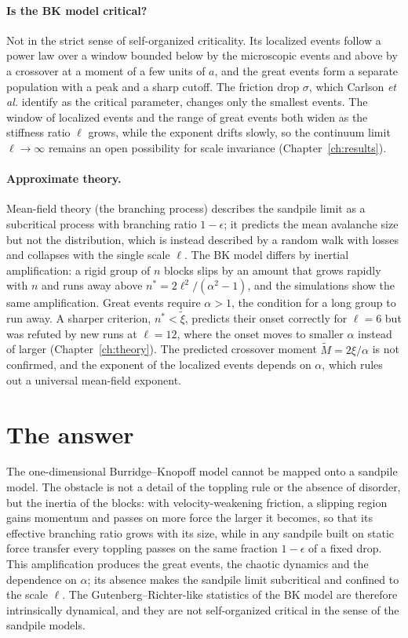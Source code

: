 \paragraph{Is the BK model critical?} Not in the strict sense of self-organized criticality. Its localized events follow a power law over a window bounded below by the
microscopic events and above by a crossover at a moment of a few units of $a$, and the great events form a separate population with a peak and a sharp cutoff. The friction
drop $\sigma$, which Carlson \emph{et al.} identify as the critical parameter, changes only the smallest events. The window of localized events and the range of great events
both widen as the stiffness ratio $\ell$ grows, while the exponent drifts slowly, so the continuum limit $\ell\to\infty$ remains an open possibility for scale invariance
(Chapter~\ref{ch:results}).

\paragraph{Approximate theory.} Mean-field theory (the branching process) describes the sandpile limit as a subcritical process with branching ratio $1-\epsilon$; it
predicts the mean avalanche size but not the distribution, which is instead described by a random walk with losses and collapses with the single scale $\ell$. The BK model
differs by inertial amplification: a rigid group of $n$ blocks slips by an amount that grows rapidly with $n$ and runs away above $n^* = 2\ell^2/(\alpha^2-1)$, and the
simulations show the same amplification. Great events require $\alpha>1$, the condition for a long group to run away. A sharper criterion, $n^*<\tilde\xi$, predicts their onset
correctly for $\ell = 6$ but was refuted by new runs at $\ell = 12$, where the onset moves to smaller $\alpha$ instead of larger (Chapter~\ref{ch:theory}). The predicted crossover moment $\tilde M = 2\xi/\alpha$ is not confirmed, and the exponent of the localized events depends on $\alpha$,
which rules out a universal mean-field exponent.

\section{The answer}

The one-dimensional Burridge--Knopoff model cannot be mapped onto a sandpile model. The obstacle is not a detail of the toppling rule or the absence of disorder, but the
inertia of the blocks: with velocity-weakening friction, a slipping region gains momentum and passes on more force the larger it becomes, so that its effective branching ratio
grows with its size, while in any sandpile built on static force transfer every toppling passes on the same fraction $1-\epsilon$ of a fixed drop. This amplification produces the
great events, the chaotic dynamics and the dependence on $\alpha$; its absence makes the sandpile limit subcritical and confined to the scale $\ell$. The Gutenberg--Richter-like
statistics of the BK model are therefore intrinsically dynamical, and they are not self-organized critical in the sense of the sandpile models.

